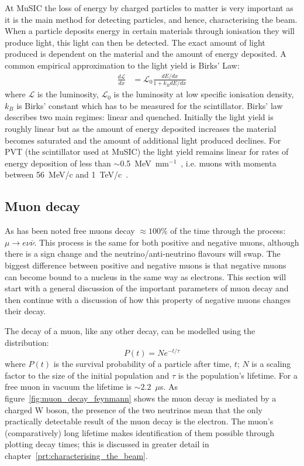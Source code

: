 At MuSIC the loss of energy by charged particles to matter is very important as it is the main method for detecting particles, and hence, characterising the beam. When a particle deposits energy in certain materials through ionisation they will produce light, this light can then be detected. The exact amount of light produced is dependent on the material and the amount of energy deposited. A common empirical approximation to the light yield is Birks' Law:
\begin{align}
  \frac{d\mathcal{L}}{dx} &= \mathcal{L}_0\frac{dE/dx}{1 + k_B dE/dx}
\end{align}
where \( \mathcal{L} \) is the luminosity, \(\mathcal{L}_0\) is the luminosity at low specific ionisation density, \(k_B\) is Birks' constant which has to be measured for the scintillator. Birks' law describes two main regimes: linear and quenched. Initially the light yield is roughly linear but as the amount of energy deposited increases the material becomes saturated and the amount of additional light produced declines. For PVT (the scintillator used at MuSIC) the light yield remains linear for rates of energy deposition of less than \(\sim\)0.5~MeV~mm\(^{-1}\)~\cite{birk_for_pvt}, i.e. muons with momenta between 56~MeV/c and 1~TeV/c~\cite{groom2001_mylar_ref}.


\subsection{Muon decay} %
\label{sec:muon_decay}
As has been noted free muons decay \(\approx100\)\% of the time through the process: \( \mu \rightarrow e \nu \overline{\nu}  \). This process is the same for both positive and negative muons, although there is a sign change and the neutrino/anti-neutrino flavours will swap. The biggest difference between positive and negative muons is that negative muons can become bound to a nucleus in the same way as electrons. This section will start with a general discussion of the important parameters of muon decay and then continue with a discussion of how this property of negative muons changes their decay.

The decay of a muon, like any other decay, can be modelled using the distribution:
\begin{equation}\label{eq:poisson}
  P(t) = Ne^{-t/\tau}
\end{equation}
where \( P(t) \) is the survival probability of a particle after time, \( t \); \( N \) is a scaling factor to the size of the initial population and \( \tau \) is the population's lifetime. For a free muon in vacuum the lifetime is \( \sim2.2\)~\( \mu \)s. As figure~\ref{fig:muon_decay_feynmann} shows the muon decay is mediated by a charged W boson, the presence of the two neutrinos mean that the only practically detectable result of the muon decay is the electron. The muon's (comparatively) long lifetime makes identification of them possible through plotting decay times; this is discussed in greater detail in chapter~\ref{prt:characterising_the_beam}.

